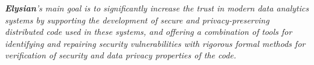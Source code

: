 \documentclass[a4paper,11pt]{article}
\newcommand{\project}[1]{\textbf{#1}\xspace}
\newcommand{\SECURITY}{\project{Elysian}}
\newcommand{\TheProject}{\SECURITY}
\begin{document}

\begin{mdframed}[backgroundcolor=blue!5]
\emph{\TheProject's main goal is to significantly increase the trust in modern data analytics systems by 
supporting the development of secure and privacy-preserving distributed code used in these systems, and 
offering a combination of %
tools for identifying and repairing security vulnerabilities with rigorous formal methods for verification of security and data privacy properties of the code.}
\end{mdframed}
\end{document}
